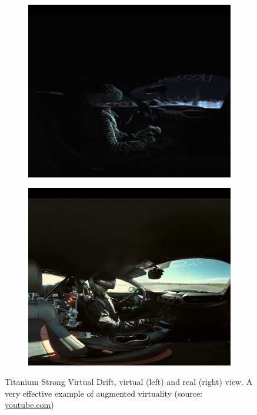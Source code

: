 \begin{figure}
\centering
\begin{subfigure}{0.49\textwidth}    
\centering
\includegraphics[scale=0.5]{pictures/titanium-a}
\end{subfigure}
\begin{subfigure}{0.49\textwidth}
\centering
\includegraphics[scale=0.5]{pictures/titanium-b}
\end{subfigure}
\caption{Titanium Strong Virtual Drift, virtual (left) and real (right) view. A very effective example of augmented virtuality (source: \href{https://www.youtube.com/watch?v=WJyG76Izk8M}{youtube.com})}
\end{figure}

